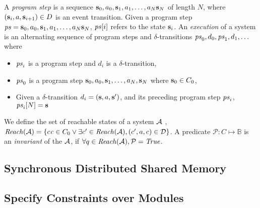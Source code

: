 A \emph{program step} is a sequence  ${\textbf{s}}_0 , a_0,  {\textbf{s}}_1, a_1, \ldots  ,a_N {\textbf{s}}_N$ of length $N$, where $({\textbf{s}}_i , a , {\textbf{s}}_{i+1}) \in D$ is an event transition. Given a program step $\mathit{ps} = {\textbf{s}}_0 , a_0,  {\textbf{s}}_1, a_1, \ldots  ,a_N {\textbf{s}}_N$, $\mathit{ps}[i]$ refers to the state ${\textbf{s}}_i$.
An \emph{execution} of a system is an alternating sequence of program steps and $\delta$-transitions $\mathit{ps}_0, d_0 , \mathit{ps}_1, d_1, \ldots$ where
\begin{itemize}
\item $\mathit{ps}_i$ is a program step and $d_i$ is a $\delta$-transition,
\item $\mathit{ps}_0$ is a program step ${\textbf{s}}_0, a_0, {\textbf{s}}_1, \ldots ,a_N, {\textbf{s}}_N $  where ${\textbf{s}}_0 \in C_0$,
\item Given a $\delta$-transition $d_i = ({\textbf{s}}, a, {\textbf{s}}')$, and its preceding program step $\mathit{ps}_i$,  $\mathit{ps}_i[N] = {\textbf{s}} $
\end{itemize}
%



We define the set of reachable states of a system $\mathcal{A}$ , $\mathit{Reach}(\mathcal{A}) = \{c \mathit c \in C_0 \vee \exists c^\prime \in \mathit{Reach}(\mathcal{A}), (c^\prime, a, c) \in \mathcal{D} \}$. A predicate $\mathcal{P} : C \mapsto \mathbb{B}$ is an \emph{invariant} of the $\mathcal{A}$, if $\forall q \in \mathit{Reach}(\mathcal{A}), \mathcal{P} = \mathit{True}$.


\subsection{Synchronous Distributed Shared Memory}
\label{sec:memory}


\subsection{Specify Constraints over Modules}
\label{sec:module}
